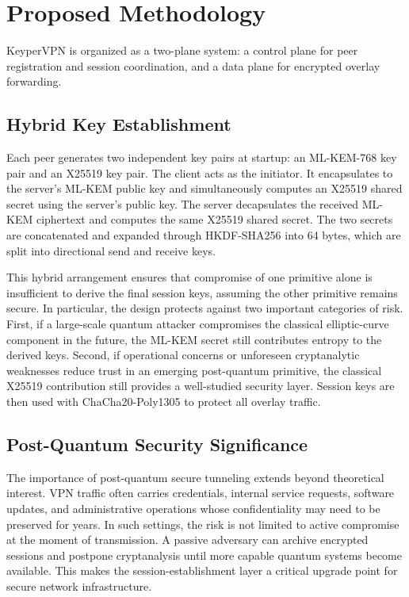 \documentclass[conference]{IEEEtran}
\begin{document}
\section{Proposed Methodology}
KeyperVPN is organized as a two-plane system: a control plane for peer registration and session coordination, and a data plane for encrypted overlay forwarding.

\subsection{Hybrid Key Establishment}
Each peer generates two independent key pairs at startup: an ML-KEM-768 key pair and an X25519 key pair. The client acts as the initiator. It encapsulates to the server's ML-KEM public key and simultaneously computes an X25519 shared secret using the server's public key. The server decapsulates the received ML-KEM ciphertext and computes the same X25519 shared secret. The two secrets are concatenated and expanded through HKDF-SHA256 into 64 bytes, which are split into directional send and receive keys.

This hybrid arrangement ensures that compromise of one primitive alone is insufficient to derive the final session keys, assuming the other primitive remains secure. In particular, the design protects against two important categories of risk. First, if a large-scale quantum attacker compromises the classical elliptic-curve component in the future, the ML-KEM secret still contributes entropy to the derived keys. Second, if operational concerns or unforeseen cryptanalytic weaknesses reduce trust in an emerging post-quantum primitive, the classical X25519 contribution still provides a well-studied security layer. Session keys are then used with ChaCha20-Poly1305 to protect all overlay traffic.

\subsection{Post-Quantum Security Significance}
The importance of post-quantum secure tunneling extends beyond theoretical interest. VPN traffic often carries credentials, internal service requests, software updates, and administrative operations whose confidentiality may need to be preserved for years. In such settings, the risk is not limited to active compromise at the moment of transmission. A passive adversary can archive encrypted sessions and postpone cryptanalysis until more capable quantum systems become available. This makes the session-establishment layer a critical upgrade point for secure network infrastructure.
\end{document}
